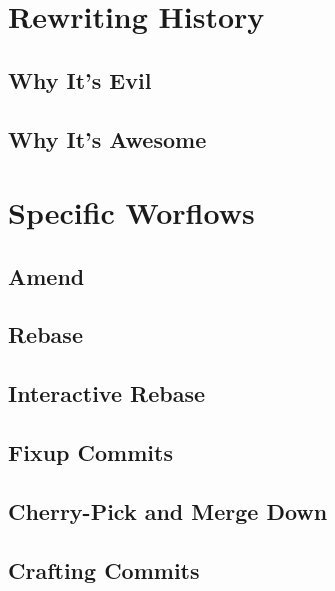 \documentclass{beamer}
\begin{document}
\section{Rewriting History}

\subsection{Why It's Evil}

\subsection{Why It's Awesome}

\section{Specific Worflows}

\subsection{Amend}

\subsection{Rebase}

\subsection{Interactive Rebase}

\subsection{Fixup Commits}

\subsection{Cherry-Pick and Merge Down}

\subsection{Crafting Commits}
\end{document}
